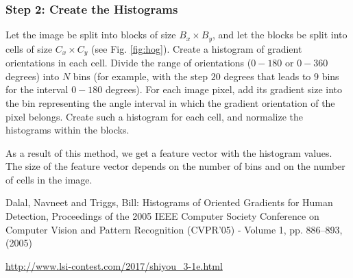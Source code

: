 \documentclass[12pt]{article}
\begin{document}
\subsubsection*{Step 2: Create the Histograms}

Let the image be split into blocks of size $B_x \times B_y$, and let the blocks be split into cells of size $C_x \times C_y$ (see Fig. \ref{fig:hog}).
Create a histogram of gradient orientations in each cell.
Divide the range of orientations ($0-180$ or $0-360$ degrees) into $N$ bins (for example, with the step $20$ degrees that leads to $9$ bins for the interval $0-180$ degrees).
For each image pixel, add its gradient size into the bin representing the angle interval in which the gradient orientation of the pixel belongs.
Create such a histogram for each cell, and normalize the histograms within the blocks.

As a result of this method, we get a feature vector with the histogram values.
The size of the feature vector depends on the number of bins and on the number of cells in the image.
\newline
\newline

\begin{thebibliography}{2}
Dalal, Navneet and Triggs, Bill: Histograms of Oriented Gradients for Human Detection, Proceedings of the 2005 IEEE Computer Society Conference on Computer Vision and Pattern Recognition (CVPR'05) - Volume 1, pp. 886--893,(2005)

\url{http://www.lsi-contest.com/2017/shiyou_3-1e.html}
\end{thebibliography}
\end{document}
